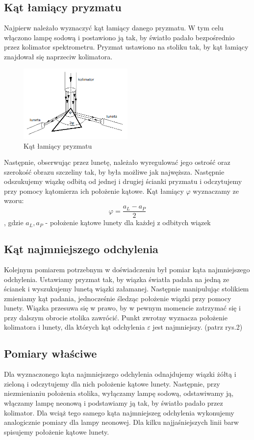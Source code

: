 \documentclass[a4paper,10pt]{article}
\begin{document}
\subsection{Kąt łamiący pryzmatu}
Najpierw należało wyznaczyć kąt łamiący danego pryzmatu. W tym celu włączono lampę sodową i postawiono ją tak, by światło padało bezpośrednio przez kolimator spektrometru. Pryzmat ustawiono na stoliku tak, by kąt łamiący znajdował się naprzeciw kolimatora. 
\begin{figure} [H]
  \centering
  \includegraphics[width=0.5\textwidth]{./phi.png}
  \caption{Kąt łamiący pryzmatu}
  \label{}
\end{figure}
Następnie, obserwując %
przez lunetę, należało wyregulować jego ostrość oraz szerokość obrazu szczeliny tak, by była możliwe jak najwęższa. Następnie odszukujemy wiązkę odbitą od jednej i drugiej ścianki pryzmatu i odczytujemy przy pomocy kątomierza ich położenie kątowe. Kąt łamiący $\varphi$ wyznaczamy ze wzoru:
\begin{equation}
\varphi = \frac{a_L - a_P}{2}
\end{equation}
, gdzie $a_L, a_P$ - położenie kątowe lunety dla każdej z odbitych wiązek

\subsection{Kąt najmniejszego odchylenia}
Kolejnym pomiarem potrzebnym w doświadczeniu był pomiar kąta najmniejszego odchylenia. Ustawiamy pryzmat tak, by wiązka światła padała na jedną ze ścianek i wyszukujemy lunetą wiązki załamanej. Następnie manipulując stolikiem zmieniamy kąt padania, jednocześnie śledząc położenie wiązki przy pomocy lunety. Wiązka przesuwa się w prawo, by w pewnym momencie zatrzymać się i przy dalszym obrocie stolika zawrócić. Punkt zwrotny wyznacza położenie kolimatora i lunety, dla których kąt odchylenia $\varepsilon$ jest najmniejszy. (patrz rys.2)

\subsection{Pomiary właściwe}
Dla wyznaczonego kąta najmniejszego odchylenia odnajdujemy wiązki żółtą i zieloną i odczytujemy dla nich położenie kątowe lunety. Następnie, przy niezmienianiu położenia stolika, wyłączamy lampę sodową, odstawiwamy ją, włączamy lampę neonową i podstawiamy ją tak, by światło padało przez kolimator. Dla wciąż tego samego kąta najmniejszeg odchylenia wykonujemy analogicznie pomiary dla lampy neonowej. Dla kilku najjaśniejszych linii barw spisujemy położenie kątowe lunety.
\end{document}

